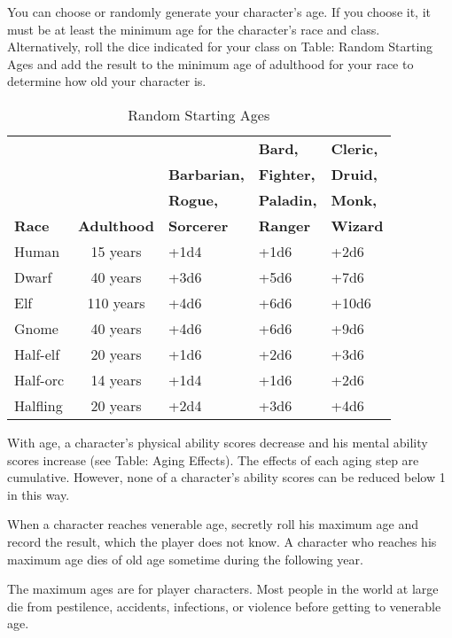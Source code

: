 				
You can choose or randomly generate your character's age. If you choose it, it must be at least the minimum age for the character's race and class. Alternatively, roll the dice indicated for your class on Table: Random Starting Ages and add the result to the minimum age of adulthood for your race to determine how old your character is.

\begin{table}[htb]
\sffamily
{}
\caption{Random Starting Ages}
\centering
\begin{tabular}{lclll}
               &                      &                      &  \textbf{Bard,}    &  \textbf{Cleric,}\\
               &                      &  \textbf{Barbarian,} &  \textbf{Fighter,} &  \textbf{Druid,}\\
               &                      &  \textbf{Rogue,}     &  \textbf{Paladin,} &  \textbf{Monk,} \\
\textbf{Race}  &  \textbf{Adulthood}  &  \textbf{Sorcerer}   &  \textbf{Ranger}   &  \textbf{Wizard}\\
Human & 15 years & +1d4 & +1d6 & +2d6\\
Dwarf & 40 years & +3d6 & +5d6 & +7d6\\
Elf & 110 years & +4d6 & +6d6 & +10d6\\
Gnome & 40 years & +4d6 & +6d6 & +9d6\\
Half-elf & 20 years & +1d6 & +2d6 & +3d6\\
Half-orc & 14 years & +1d4 & +1d6 & +2d6\\
Halfling & 20 years & +2d4 & +3d6 & +4d6\\
\end{tabular}
\end{table}

				
With age, a character's physical ability scores decrease and his mental ability scores increase (see Table: Aging Effects). The effects of each aging step are cumulative. However, none of a character's ability scores can be reduced below 1 in this way.
				
When a character reaches venerable age, secretly roll his maximum age and record the result, which the player does not know. A character who reaches his maximum age dies of old age sometime during the following year.
				
The maximum ages are for player characters. Most people in the world at large die from pestilence, accidents, infections, or violence before getting to venerable age.

